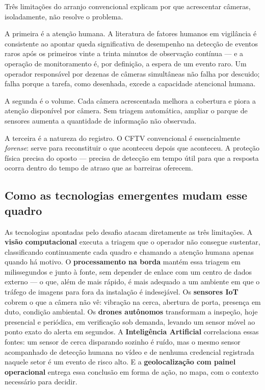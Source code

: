 \documentclass[12pt,a4paper,oneside]{article}
\begin{document}
Três limitações do arranjo convencional explicam por que acrescentar câmeras,
isoladamente, não resolve o problema.

A primeira é a atenção humana. A literatura de fatores humanos em vigilância é
consistente ao apontar queda significativa de desempenho na detecção de eventos
raros após os primeiros vinte a trinta minutos de observação contínua — e a
operação de monitoramento é, por definição, a espera de um evento raro. Um
operador responsável por dezenas de câmeras simultâneas não falha por
descuido; falha porque a tarefa, como desenhada, excede a capacidade atencional
humana.

A segunda é o volume. Cada câmera acrescentada melhora a cobertura e piora a
atenção disponível por câmera. Sem triagem automática, ampliar o parque de
sensores aumenta a quantidade de informação não observada.

A terceira é a natureza do registro. O CFTV convencional é essencialmente
\emph{forense}: serve para reconstituir o que aconteceu depois que aconteceu.
A proteção física precisa do oposto — precisa de detecção em tempo útil para
que a resposta ocorra dentro do tempo de atraso que as barreiras oferecem.

\subsection{Como as tecnologias emergentes mudam esse quadro}

As tecnologias apontadas pelo desafio atacam diretamente as três limitações. A
\textbf{visão computacional} executa a triagem que o operador não consegue
sustentar, classificando continuamente cada quadro e chamando a atenção humana
apenas quando há motivo. O \textbf{processamento na borda} mantém essa triagem
em milissegundos e junto à fonte, sem depender de enlace com um centro de dados
externo — o que, além de mais rápido, é mais adequado a um ambiente em que o
tráfego de imagens para fora da instalação é indesejável. Os \textbf{sensores
IoT} cobrem o que a câmera não vê: vibração na cerca, abertura de porta,
presença em duto, condição ambiental. Os \textbf{drones autônomos} transformam
a inspeção, hoje presencial e periódica, em verificação sob demanda, levando um
sensor móvel ao ponto exato do alerta em segundos. A \textbf{Inteligência
Artificial} correlaciona essas fontes: um sensor de cerca disparando sozinho é
ruído, mas o mesmo sensor acompanhado de detecção humana no vídeo e de nenhuma
credencial registrada naquele setor é um evento de risco alto. E a
\textbf{geolocalização com painel operacional} entrega essa conclusão em forma
de ação, no mapa, com o contexto necessário para decidir.
\end{document}
